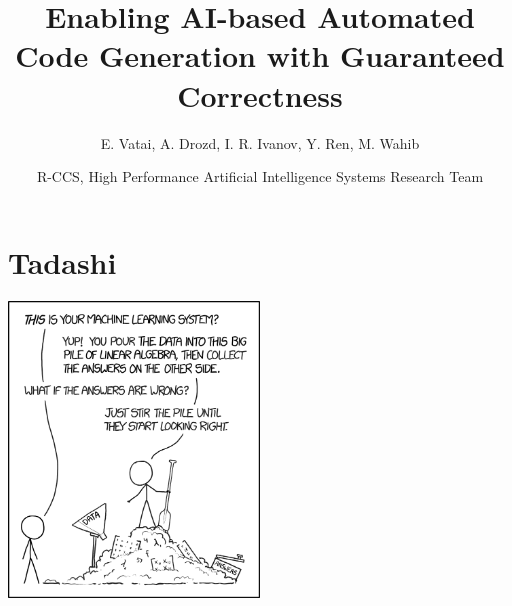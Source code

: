 \documentclass[presentation, aspectratio=169]{beamer}
\author{\alert{E. Vatai}, A. Drozd, I. R. Ivanov, Y. Ren, M. Wahib}
\date{R-CCS, High Performance Artificial Intelligence Systems Research Team}
\title{Enabling AI-based Automated Code Generation with Guaranteed Correctness}
\begin{document}
\maketitle
\section{Tadashi}
\label{sec:org14d3e85}
\begin{frame}[label={sec:org152fac9}]{}
\begin{center}
\includegraphics[width=0.5\textwidth]{./figs/xkcd.png}
\end{center}
\end{frame}
\end{document}
